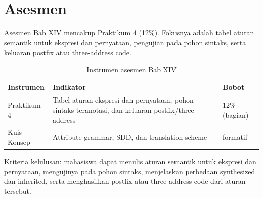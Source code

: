 \section*{Asesmen}

Asesmen Bab XIV mencakup Praktikum 4 (12\%). Fokusnya adalah tabel
aturan semantik untuk ekspresi dan pernyataan, pengujian pada pohon
sintaks, serta keluaran postfix atau three-address code.

\begin{table}[H]
\centering
\caption{Instrumen asesmen Bab XIV}
\label{tab:ch14-asesmen}
\begin{tabularx}{\textwidth}{@{}lXl@{}}
\toprule
\textbf{Instrumen} & \textbf{Indikator} & \textbf{Bobot} \\
\midrule
Praktikum 4 & Tabel aturan ekspresi dan pernyataan, pohon sintaks
teranotasi, dan keluaran postfix/three-address & 12\% (bagian) \\
Kuis Konsep & Attribute grammar, SDD, dan translation scheme &
formatif \\
\bottomrule
\end{tabularx}
\end{table}

Kriteria kelulusan: mahasiswa dapat menulis aturan semantik untuk
ekspresi dan pernyataan, mengujinya pada pohon sintaks, menjelaskan
perbedaan synthesized dan inherited, serta menghasilkan postfix atau
three-address code dari aturan tersebut.
